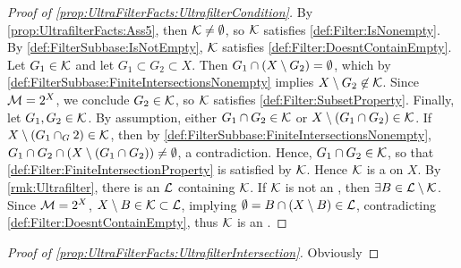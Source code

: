 \begin{prop}
\begin{proof}[Proof of \ref{prop:UltraFilterFacts:UltrafilterCondition}]
        By \ref{prop:UltrafilterFacts:Ass5}, then $\mathcal{K} \neq \emptyset$, so 
        $\mathcal{K}$ satisfies \ref{def:Filter:IsNonempty}.
        By \ref{def:FilterSubbase:IsNotEmpty}, $\mathcal{K}$ satisfies \ref{def:Filter:DoesntContainEmpty}.
        Let $G_1 \in \mathcal{K}$ and let $G_1 \subset G_2 \subset X$. 
        Then $G_1 \cap \left( X \setminus G_2\right) = \emptyset$, 
        which by 
        \ref{def:FilterSubbase:FiniteIntersectionsNonempty}
        implies $X \setminus G_2 \not \in \mathcal{K}$. 
        Since $\mathcal{M} = 2^{X}$, we conclude $G_2 \in \mathcal{K}$, so
        $\mathcal{K}$ satisfies \ref{def:Filter:SubsetProperty}. 
        Finally, let 
        $G_1,G_2 \in \mathcal{K}$. 
        By assumption, either $G_1 \cap G_2 \in \mathcal{K}$  or $X \setminus \left( G_1 \cap G_2 \right) \in \mathcal{K}$. 
        If $X \setminus \left( G_1 \cap _G2\right) \in \mathcal{K}$, then by 
        \ref{def:FilterSubbase:FiniteIntersectionsNonempty}, 
        $G_1 \cap G_2 \cap \left( X \setminus \left( G_1 \cap G_2\right)\right) \neq \emptyset$, a contradiction.
        Hence, $G_1 \cap G_2 \in \mathcal{K}$, so that \ref{def:Filter:FiniteIntersectionProperty}
        is satisfied by $\mathcal{K}$. 
        Hence $\mathcal{K}$ is a \Filter on $X$. 
        By \ref{rmk:Ultrafilter}, there is an \Ultrafilter $\mathcal{L}$ containing $\mathcal{K}$. 
        If $\mathcal{K}$ is not an \Ultrafilter, then $\exists B \in \mathcal{L} \setminus \mathcal{K}$. 
        Since $\mathcal{M} = 2^{X}$, $X \setminus B \in \mathcal{K} \subset \mathcal{L}$, 
        implying $\emptyset =B \cap \left( X \setminus B\right)  \in \mathcal{L}$, contradicting 
        \ref{def:Filter:DoesntContainEmpty}, thus
        $\mathcal{K}$ is an \Ultrafilter. 
    \end{proof}
    \begin{proof}[Proof of \ref{prop:UltraFilterFacts:UltrafilterIntersection}]
    Obviously 

    \end{proof}
\end{prop}
